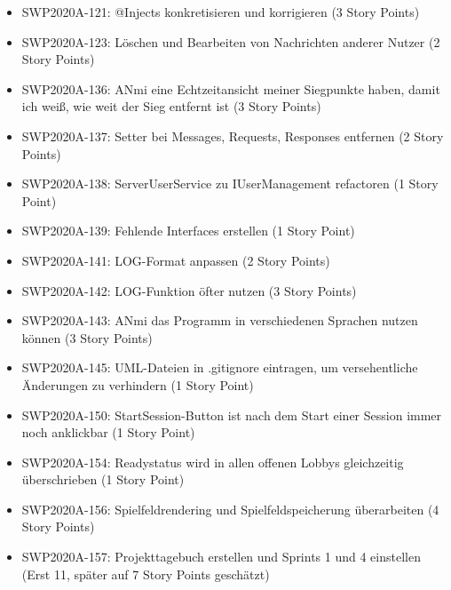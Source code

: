 \documentclass[12pt,a4paper, oneside]{article}
\begin{document}
    \begin{itemize}
        \item SWP2020A-121: @Injects konkretisieren und korrigieren (3 Story Points)

        \item SWP2020A-123: Löschen und Bearbeiten von Nachrichten anderer Nutzer (2 Story Points)

        \item SWP2020A-136: ANmi eine Echtzeitansicht meiner Siegpunkte haben, damit ich weiß, wie weit der Sieg entfernt ist (3 Story Points)

        \item SWP2020A-137: Setter bei Messages, Requests, Responses entfernen (2 Story Points)

        \item SWP2020A-138: ServerUserService zu IUserManagement refactoren (1 Story Point)

        \item SWP2020A-139: Fehlende Interfaces erstellen (1 Story Point)

        \item SWP2020A-141: LOG-Format anpassen     (2 Story Points)

        \item SWP2020A-142: LOG-Funktion öfter nutzen (3 Story Points)

        \item SWP2020A-143: ANmi das Programm in verschiedenen Sprachen nutzen können    (3 Story Points)

        \item SWP2020A-145: UML-Dateien in .gitignore eintragen, um versehentliche Änderungen zu verhindern    (1 Story Point)

        \item SWP2020A-150: StartSession-Button ist nach dem Start einer Session immer noch anklickbar (1 Story Point)

        \item SWP2020A-154: Readystatus wird in allen offenen Lobbys gleichzeitig überschrieben    (1 Story Point)

        \item SWP2020A-156: Spielfeldrendering und Spielfeldspeicherung überarbeiten (4 Story Points)

        \item SWP2020A-157: Projekttagebuch erstellen und Sprints 1 und 4 einstellen (Erst 11, später auf 7 Story Points geschätzt)


\end{itemize}
\end{document}
